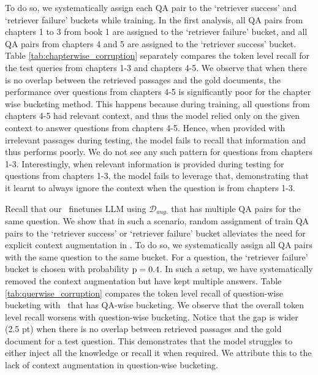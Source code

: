 To do so, we systematically assign each QA pair to the `retriever success' and `retriever failure' buckets while training. 
In the first analysis, all QA pairs from chapters 1 to 3 from book 1 are assigned to the `retriever failure' bucket, and all QA pairs from chapters 4 and 5 are assigned to the `retriever success' bucket. 
Table \ref{tab:chapterwise_corruption} separately compares the token level recall for the test queries from chapters 1-3 and chapters 4-5. 
We observe that when there is no overlap between the retrieved passages and the gold documents, the performance over questions from chapters 4-5 is significantly poor for the chapter wise bucketing method.  
This happens because during training, all questions from chapters 4-5 had relevant context, and thus the model relied only on the given context to answer questions from chapters 4-5. Hence, when provided with irrelevant passages during testing, the model fails to recall that information and thus performs poorly.
We do not see any such pattern for questions from chapters 1-3.
Interestingly, when relevant information is provided during testing for questions from chapters 1-3, the model fails to leverage that, demonstrating that it learnt to always ignore the context when the question is from chapters 1-3.


Recall that our \ourmethodshort\ finetunes LLM using $\mathcal{D}_{aug.}$ that has multiple QA pairs for the same question. 
We show that in such a scenario, random assignment of train QA pairs to the `retriever success' or `retriever failure' bucket alleviates the need for explicit context augmentation in \ourmethodshort.   
To do so, we systematically assign all QA pairs with the same question to the same bucket. For a question, the `retriever failure' bucket is chosen with probability $\mathrm{p}=0.4$.
In such a setup, we have systematically removed the context augmentation but have kept multiple answers.
Table \ref{tab:querwise_corruption} compares the token level recall of question-wise bucketing with \ourmethodshort\ that has QA-wise bucketing.
We observe that the overall token level recall worsens with question-wise bucketing. 
Notice that the gap is wider (2.5 pt) when there is no overlap between retrieved passages and the gold document for a test question. This demonstrates that the model struggles to either inject all the knowledge or recall it when required.
We attribute this to the lack of context augmentation in question-wise bucketing.

